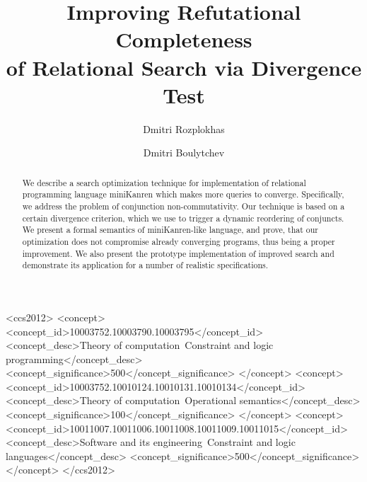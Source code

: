 \documentclass[sigconf]{acmart}
\begin{document}
\title{Improving Refutational Completeness\\
of Relational Search via Divergence Test}


\author{Dmitri Rozplokhas}

\author{Dmitri Boulytchev}


\begin{abstract}
We describe a search optimization technique for implementation of relational programming language
miniKanren which makes more queries to converge. Specifically, we address the problem of conjunction
non-commutativity. Our technique is based on a certain divergence criterion, which we use to trigger a
dynamic reordering of conjuncts. We present a formal semantics of miniKanren-like language, and prove,
that our optimization does not compromise already converging programs, thus being a proper improvement.
We also present the prototype implementation of improved search and demonstrate its application for a
number of realistic specifications.
\end{abstract}

%
%
\begin{CCSXML}
<ccs2012>
<concept>
<concept_id>10003752.10003790.10003795</concept_id>
<concept_desc>Theory of computation~Constraint and logic programming</concept_desc>
<concept_significance>500</concept_significance>
</concept>
<concept>
<concept_id>10003752.10010124.10010131.10010134</concept_id>
<concept_desc>Theory of computation~Operational semantics</concept_desc>
<concept_significance>100</concept_significance>
</concept>
<concept>
<concept_id>10011007.10011006.10011008.10011009.10011015</concept_id>
<concept_desc>Software and its engineering~Constraint and logic languages</concept_desc>
<concept_significance>500</concept_significance>
</concept>
</ccs2012>
\end{CCSXML}
\end{document}

